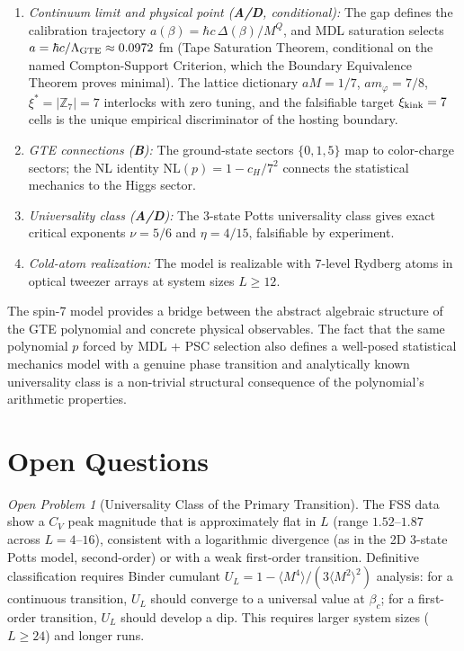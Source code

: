 \documentclass[11pt]{article}
\theoremstyle{remark}
\newtheorem{openprob}{Open Problem}
\newcommand{\CatAD}{\textbf{A/D}}
\newcommand{\CatB}{\textbf{B}}
\begin{document}
\begin{enumerate}[leftmargin=2em,itemsep=3pt]
  \item \emph{Continuum limit and physical point (\CatAD{}, conditional):}
    The gap defines the calibration trajectory $a(\beta) = \hbar c\,
    \Delta(\beta)/M^Q$, and MDL saturation selects $a = \hbar c/
    \Lambda_{\rm GTE} \approx 0.0972$ fm (Tape Saturation Theorem, conditional
    on the named Compton-Support Criterion, which the Boundary Equivalence
    Theorem proves minimal). The lattice dictionary $aM = 1/7$,
    $am_\varphi = 7/8$, $\xi^* = |\mathbb{Z}_7| = 7$ interlocks with zero
    tuning, and the falsifiable target $\xi_{\rm kink} = 7$ cells is the
    unique empirical discriminator of the hosting boundary.
  \item \emph{GTE connections (\CatB{}):} The ground-state sectors $\{0,1,5\}$ map to
    color-charge sectors; the NL identity $\mathrm{NL}(p) = 1 - c_H/7^2$ connects the
    statistical mechanics to the Higgs sector.
  \item \emph{Universality class (\CatAD{}):} The 3-state Potts universality class gives
    exact critical exponents $\nu = 5/6$ and $\eta = 4/15$, falsifiable by experiment.
  \item \emph{Cold-atom realization:} The model is realizable with 7-level Rydberg atoms
    in optical tweezer arrays at system sizes $L \geq 12$.
\end{enumerate}

The spin-7 model provides a bridge between the abstract algebraic structure of the
GTE polynomial and concrete physical observables. The fact that the same polynomial
$p$ forced by MDL + PSC selection also defines a well-posed statistical mechanics model
with a genuine phase transition and analytically known universality class is a
non-trivial structural consequence of the polynomial's arithmetic properties.

\section{Open Questions}
\label{sec:open}

\begin{openprob}[Universality Class of the Primary Transition]
The FSS data show a $C_V$ peak magnitude that is approximately flat in $L$ (range
$1.52$--$1.87$ across $L = 4$--$16$), consistent with a logarithmic divergence
(as in the 2D 3-state Potts model, second-order) or with a weak first-order
transition. Definitive classification requires Binder cumulant $U_L = 1 -
\langle M^4 \rangle / (3 \langle M^2 \rangle^2)$ analysis: for a continuous
transition, $U_L$ should converge to a universal value at $\beta_c$; for a
first-order transition, $U_L$ should develop a dip. This requires larger system
sizes ($L \geq 24$) and longer runs.
\end{openprob}
\end{document}
